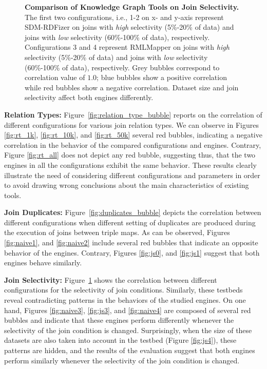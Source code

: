\begin{figure}[!tb]
    \caption[Knowledge Graph Tools on Join Selectivity]{\textbf{Comparison of Knowledge Graph Tools on Join Selectivity.} The first two configurations, i.e., 1-2 on x- and y-axis represent SDM-RDFizer on joins with \textit{high} selectivity (5\%-20\% of data) and joins with \textit{low} selectivity (60\%-100\% of data), respectively.  Configurations 3 and 4 represent RMLMapper on joins with \textit{high} selectivity (5\%-20\% of data) and joins with \textit{low} selectivity (60\%-100\% of data), respectively. Grey bubbles correspond to correlation value of $1.0$; blue bubbles show a positive correlation while red bubbles show a negative correlation. Dataset size and join selectivity affect both engines differently.}
    \label{fig:joinselectivity_bubble}
\end{figure}



\noindent \textbf{Relation Types:}
Figure~\ref{fig:relation_type_bubble} reports on the correlation of different configurations for various join relation types. We can observe in Figures \ref{fig:rt_1k}, \ref{fig:rt_10k}, and \ref{fig:rt_50k} several red bubbles, indicating a negative correlation in the behavior of the compared configurations and engines. Contrary, Figure \ref{fig:rt_all} does not depict any red bubble, suggesting thus, that the two engines in all the configurations exhibit the same behavior. These results clearly illustrate the need of considering different configurations and parameters in order to avoid drawing wrong conclusions about the main characteristics of existing tools. 


\noindent \textbf{Join Duplicates:}
Figure~\ref{fig:duplicates_bubble} depicts the correlation between different configurations when different setting of duplicates are produced during the execution of joins between triple maps. As can be observed, Figures \ref{fig:naive1}, and \ref{fig:naive2} include several red bubbles that indicate an opposite behavior of the engines. Contrary, Figures \ref{fig:js0}, and \ref{fig:js1} suggest that both engines behave similarly. 


\noindent \textbf{Join Selectivity:}
Figure~\ref{fig:joinselectivity_bubble} shows the correlation between different configurations for the selectivity of join conditions. Similarly, these testbeds reveal contradicting patterns in the behaviors of the studied engines. On one hand, Figures \ref{fig:naive3}, \ref{fig:js3}, and \ref{fig:naive4} are composed of several red bubbles and indicate that these engines perform differently whenever the selectivity of the join condition is changed. Surprisingly,  when the size of these datasets are also taken into account in the testbed (Figure \ref{fig:js4}), these patterns are hidden, and the results of the evaluation suggest that both engines perform similarly whenever the selectivity of the join condition is changed. 

